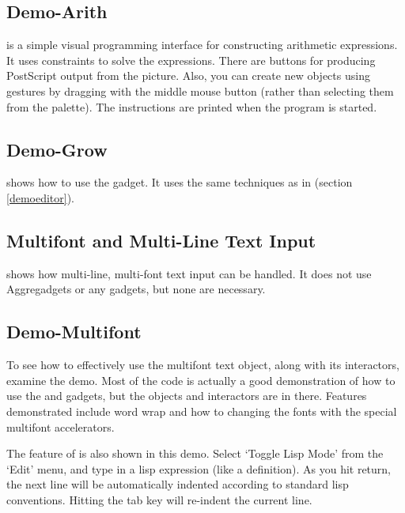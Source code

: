 \subsection{Demo-Arith}

 is a simple visual programming interface for constructing
arithmetic expressions.  It uses constraints to solve the expressions.
There are buttons for producing PostScript output from the picture.
Also, you can create new objects using gestures by dragging with the
middle mouse button (rather than selecting them from the palette).
The instructions are printed when the program is started.



\subsection{Demo-Grow}
\label{demogrow}
 shows how to use the  gadget.
It uses the same techniques as in  (section \ref{demoeditor}).


\subsection{Multifont and Multi-Line Text Input}

 shows how multi-line, multi-font text input can be handled.
It does not use Aggregadgets or any gadgets, but none are necessary.


\subsection{Demo-Multifont}

To see how to effectively use the multifont text object, along with its
interactors, examine the  demo.  Most of the code
is actually a good demonstration of how to use the  and
 gadgets, but the
 objects and interactors are in there.  Features
demonstrated include word wrap and how to changing the fonts with the special
multifont accelerators.

The  feature of  is also shown in this
demo.  Select `Toggle Lisp Mode' from the `Edit' menu, and type in a lisp
expression (like a  definition).  As you hit return, the next line
will be automatically indented according to standard lisp conventions.  Hitting
the tab key will re-indent the current line.


